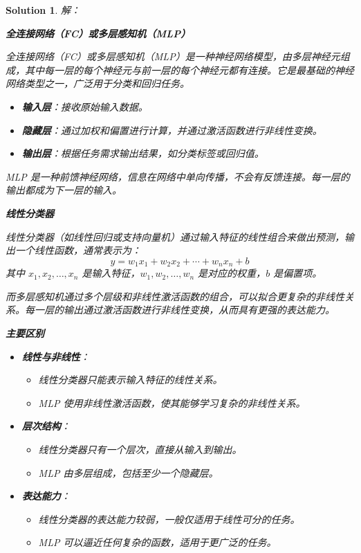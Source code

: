 \documentclass{article}
\theoremstyle{Problem}
\theoremstyle{Solution}
\newtheorem*{sol}{Solution}
\begin{document}
	\begin{sol}
		解：
		
		
		\textbf{全连接网络（FC）或多层感知机（MLP）}
		
		全连接网络（FC）或多层感知机（MLP）是一种神经网络模型，由多层神经元组成，其中每一层的每个神经元与前一层的每个神经元都有连接。它是最基础的神经网络类型之一，广泛用于分类和回归任务。
		\begin{itemize}
			\item \textbf{输入层}：接收原始输入数据。
			\item \textbf{隐藏层}：通过加权和偏置进行计算，并通过激活函数进行非线性变换。
			\item \textbf{输出层}：根据任务需求输出结果，如分类标签或回归值。
		\end{itemize}
		
		MLP 是一种前馈神经网络，信息在网络中单向传播，不会有反馈连接。每一层的输出都成为下一层的输入。
		
		\textbf{线性分类器}
		
		线性分类器（如线性回归或支持向量机）通过输入特征的线性组合来做出预测，输出一个线性函数，通常表示为：
		\[
		y = w_1 x_1 + w_2 x_2 + \cdots + w_n x_n + b
		\]
		其中 \( x_1, x_2, \dots, x_n \) 是输入特征，\( w_1, w_2, \dots, w_n \) 是对应的权重，\( b \) 是偏置项。
		
		而多层感知机通过多个层级和非线性激活函数的组合，可以拟合更复杂的非线性关系。每一层的输出通过激活函数进行非线性变换，从而具有更强的表达能力。
		
		\textbf{主要区别}
		\begin{itemize}
			\item \textbf{线性与非线性}：
			\begin{itemize}
				\item 线性分类器只能表示输入特征的线性关系。
				\item MLP 使用非线性激活函数，使其能够学习复杂的非线性关系。
			\end{itemize}
			\item \textbf{层次结构}：
			\begin{itemize}
				\item 线性分类器只有一个层次，直接从输入到输出。
				\item MLP 由多层组成，包括至少一个隐藏层。
			\end{itemize}
			\item \textbf{表达能力}：
			\begin{itemize}
				\item 线性分类器的表达能力较弱，一般仅适用于线性可分的任务。
				\item MLP 可以逼近任何复杂的函数，适用于更广泛的任务。
			\end{itemize}
		\end{itemize}
	\end{sol}
	
\end{document}
